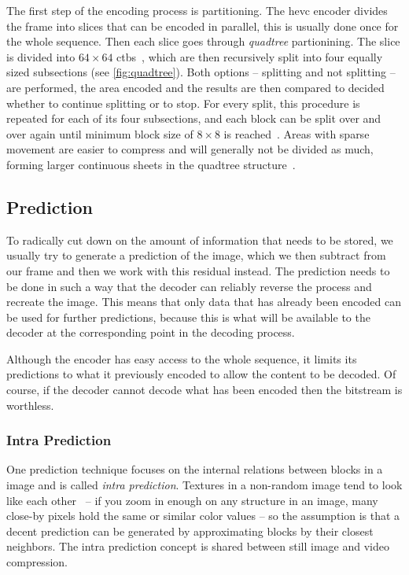 The first step of the encoding process is partitioning. The \gls{hevc} encoder divides the frame into slices that can be encoded in parallel, this is usually done once for the whole sequence. Then each slice goes through \textit{quadtree} partionining. The slice is divided into $64 \times 64$ \glspl{ctb}~\cite{Vcodex_HEVC_introduction}, which are then recursively split into four equally sized subsections (see \cref{fig:quadtree}). Both options -- splitting and not splitting -- are performed, the area encoded and the results are then compared to decided whether to continue splitting or to stop. For every split, this procedure is repeated for each of its four subsections, and each block can be split over and over again until minimum block size of $8 \times 8$ is reached~\cite{Van_Wallendael}. Areas with sparse movement are easier to compress and will generally not be divided as much, forming larger continuous sheets in the quadtree structure~\cite{Vcodex_HEVC_introduction}.

\subsection{Prediction}
To radically cut down on the amount of information that needs to be stored, we usually try to generate a prediction of the image, which we then subtract from our frame and then we work with this residual instead. The prediction needs to be done in such a way that the decoder can reliably reverse the process and recreate the image. This means that only data that has already been encoded can be used for further predictions, because this is what will be available to the decoder at the corresponding point in the decoding process.

Although the encoder has easy access to the whole sequence, it limits its predictions to what it previously encoded to allow the content to be decoded. Of course, if the decoder cannot decode what has been encoded then the bitstream is worthless.


\subsubsection{Intra Prediction}
One prediction technique focuses on the internal relations between blocks in a image and is called \textit{intra prediction}. Textures in a non-random image tend to look like each other~\cite{Wien_Coding_Tools} -- if you zoom in enough on any structure in an image, many close-by pixels hold the same or similar color values -- so the assumption is that a decent prediction can be generated by approximating blocks by their closest neighbors. The intra prediction concept is shared between still image and video compression.

